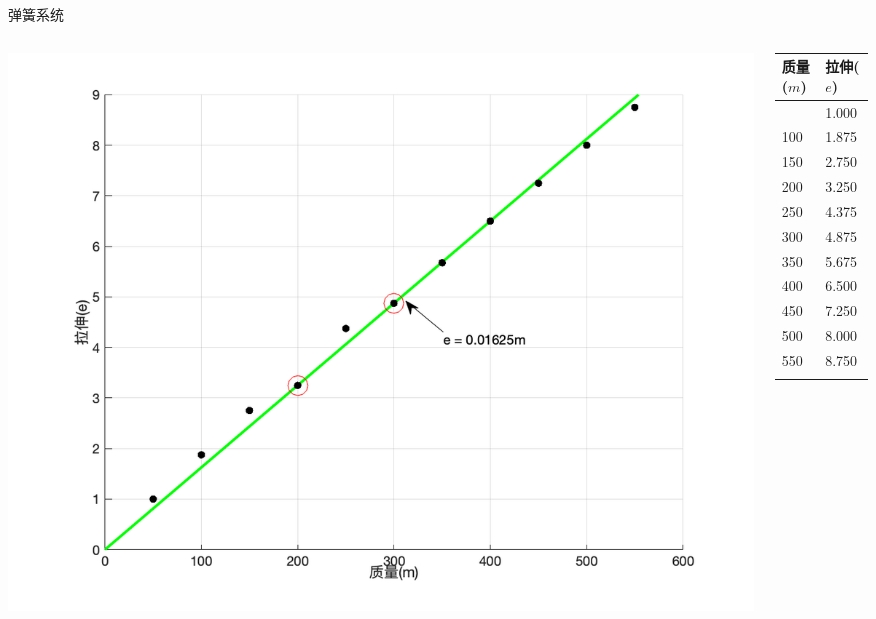 \documentclass[
  ignorenonframetext,
]{ctexbeamer}
\begin{document}
\begin{frame}{弹簧系统}
\label{ux5f39ux7c27ux7cfbux7edf}
\begin{columns}[T]
\begin{column}{0.55\textwidth}
\includegraphics{images/spring_mass.png}
\end{column}

\begin{column}{0.25\textwidth}
\begin{longtable}[]{@{}ll@{}}
\toprule\noalign{}
质量(\(m\)) & 拉伸(\(e\)) \\
\midrule\noalign{}
\endhead
50 & 1.000 \\
100 & 1.875 \\
150 & 2.750 \\
200 & 3.250 \\
250 & 4.375 \\
300 & 4.875 \\
350 & 5.675 \\
400 & 6.500 \\
450 & 7.250 \\
500 & 8.000 \\
550 & 8.750 \\
\bottomrule\noalign{}
\end{longtable}
\end{column}


\end{columns}
\end{frame}
\end{document}
